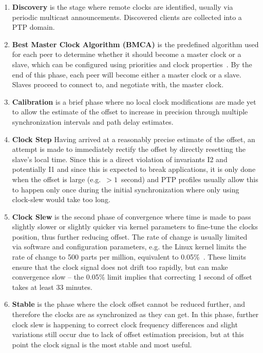 \begin{enumerate}[label=S\arabic*.]
    \item \textbf{Discovery} is the stage where remote clocks are identified, usually via periodic multicast announcements. Discovered clients are collected into a PTP domain.
    \item \textbf{Best Master Clock Algorithm (BMCA)} is the predefined algorithm used for each peer to determine whether it should become a master clock or a slave, which can be configured using priorities and clock properties~\cite{bmca-deep-dive}. By the end of this phase, each peer will become either a master clock or a slave. Slaves proceed to connect to, and negotiate with, the master clock.
    \item \textbf{Calibration} is a brief phase where no local clock modifications are made yet to allow the estimate of the offset to increase in precision through multiple synchronization intervals and path delay estimates.
    \item \textbf{Clock Step} Having arrived at a reasonably precise estimate of the offset, an attempt is made to immediately rectify the offset by directly resetting the slave's local time. Since this is a direct violation of invariants I2 and potentially I1 and since this is expected to break applications, it is only done when the offset is large (e.g.~$>1$~second) and PTP profiles usually allow this to happen only once during the initial synchronization where only using clock-slew would take too long.
    \item \textbf{Clock Slew} is the second phase of convergence where time is made to pass slightly slower or slightly quicker via kernel parameters to fine-tune the clocks position, thus further reducing offset. The rate of change is usually limited via software and configuration parameters, e.g. the Linux kernel limits the rate of change to 500 parts per million, equivalent to 0.05\%~\cite{adjtimex}. These limits ensure that the clock signal does not drift too rapidly, but can make convergence slow -- the 0.05\% limit implies that correcting 1 second of offset takes at least 33 minutes.
    \item \textbf{Stable} is the phase where the clock offset cannot be reduced further, and therefore the clocks are as synchronized as they can get. In this phase, further clock slew is happening to correct clock frequency differences and slight variations still occur due to lack of offset estimation precision, but at this point the clock signal is the most stable and most useful.
\end{enumerate}